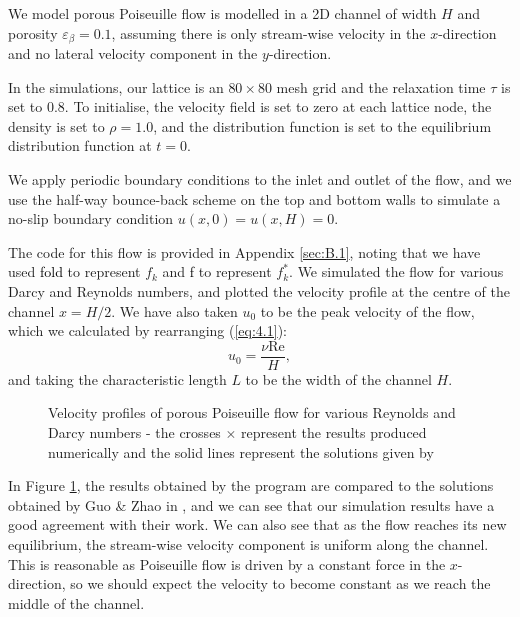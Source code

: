 \documentclass[a4paper, 11pt]{report}
\begin{document}
We model porous Poiseuille flow is modelled in a 2D channel of width $H$ and porosity $\varepsilon_\beta=0.1$, assuming there is only stream-wise velocity in the $x$-direction and no lateral velocity component in the $y$-direction.

In the simulations, our lattice is an $80\times80$ mesh grid and the relaxation time $\tau$ is set to 0.8. %
To initialise, the velocity field is set to zero at each lattice node, the density is set to $\rho=1.0$, and the distribution function is set to the equilibrium distribution function at $t=0$.

We apply periodic boundary conditions to the inlet and outlet of the flow, and we use the half-way bounce-back scheme on the top and bottom walls to simulate a no-slip boundary condition $u(x,0)=u(x,H)=0$. 

The code for this flow is provided in Appendix \ref{sec:B.1}, noting that we have used {\selectfont\textcolor{black}{fold}} to represent $f_k$ and {\selectfont\textcolor{black}{f}} to represent $f_k^*$. We simulated the flow for various Darcy and Reynolds numbers, and plotted the velocity profile at the centre of the channel $x=H/2$. We have also taken $u_0$ to be the peak velocity of the flow, which we calculated by rearranging (\ref{eq:4.1}):
\begin{equation}
    u_0 = \frac{\nu \mathrm{Re}}{H}, \label{eq:4.5}
\end{equation}
and taking the characteristic length $L$ to be the width of the channel $H$.

\begin{figure}[!htb]
\begin{flushleft}
\centering
    
    
\end{flushleft}
\caption[Velocity profiles of porous Poiseuille flow for various Reynolds and Darcy numbers]{Velocity profiles of porous Poiseuille flow for various Reynolds and Darcy numbers - the crosses $\times$ represent the results produced numerically and the solid lines represent the solutions given by \cite{guo+zhao}}
\label{fig:numpoiseuille}
\end{figure}

In Figure \ref{fig:numpoiseuille}, the results obtained by the program are compared to the solutions obtained by Guo \& Zhao in \cite{guo+zhao}, and we can see that our simulation results have a good agreement with their work. We can also see that as the flow reaches its new equilibrium, the stream-wise velocity component is uniform along the channel. This is reasonable as Poiseuille flow is driven by a constant force in the $x$-direction, so we should expect the velocity to become constant as we reach the middle of the channel.
\end{document}
